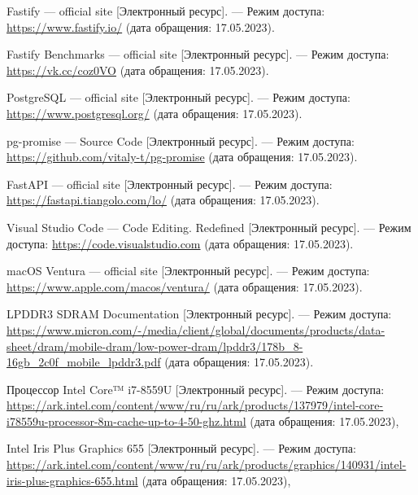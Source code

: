 \begin{thebibliography}{}
	Fastify --- official site [Электронный ресурс]. --- Режим доступа: \url{https://www.fastify.io/} (дата обращения: 17.05.2023).
	
	Fastify Benchmarks --- official site [Электронный ресурс]. --- Режим доступа: \url{https://vk.cc/coz0VO} (дата обращения: 17.05.2023).

	PostgreSQL --- official site [Электронный ресурс]. --- Режим доступа: \url{https://www.postgresql.org/} (дата обращения: 17.05.2023).
	
	pg-promise --- Source Code [Электронный ресурс]. --- Режим доступа: \url{https://github.com/vitaly-t/pg-promise} (дата обращения: 17.05.2023).

	FastAPI --- official site [Электронный ресурс]. --- Режим доступа: \url{https://fastapi.tiangolo.com/lo/} (дата обращения: 17.05.2023).

	Visual Studio Code --- Code Editing. Redefined [Электронный ресурс]. --- Режим доступа: \url{https://code.visualstudio.com} (дата обращения: 17.05.2023).
	
	macOS Ventura --- official site [Электронный
	ресурс]. --- Режим доступа: \url{https://www.apple.com/macos/ventura/} (дата обращения: 17.05.2023).

	LPDDR3 SDRAM Documentation [Электронный
	ресурс]. --- Режим доступа: \url{https://www.micron.com/-/media/client/global/documents/products/data-sheet/dram/mobile-dram/low-power-dram/lpddr3/178b_8-16gb_2c0f_mobile_lpddr3.pdf} (дата обращения: 17.05.2023).

	Процессор Intel Core™ i7-8559U [Электронный ресурс]. --- Режим доступа: \url{https://ark.intel.com/content/www/ru/ru/ark/products/137979/intel-core-i78559u-processor-8m-cache-up-to-4-50-ghz.html} (дата обращения: 17.05.2023),
	
	Intel Iris Plus Graphics 655 [Электронный ресурс]. --- Режим доступа: \url{https://ark.intel.com/content/www/ru/ru/ark/products/graphics/140931/intel-iris-plus-graphics-655.html} (дата обращения: 17.05.2023),

\end{thebibliography}
\endgroup

\pagebreak